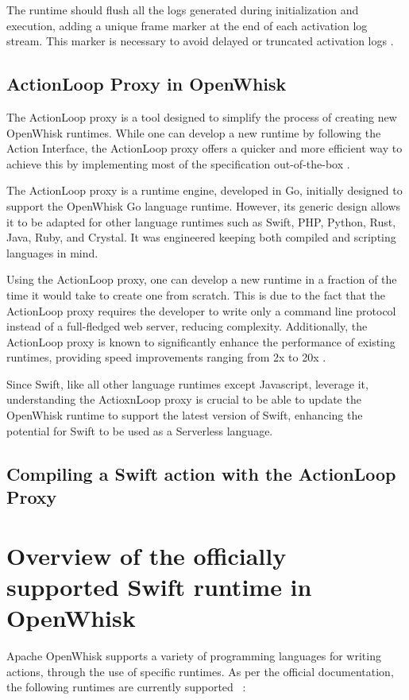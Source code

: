 The runtime should flush all the logs generated during initialization and execution, adding a unique frame marker at the end of each activation log stream. This marker is necessary to avoid delayed or truncated activation logs \cite{openwhisk2023}.

\subsection{ActionLoop Proxy in OpenWhisk}

The ActionLoop proxy is a tool designed to simplify the process of creating new OpenWhisk runtimes. While one can develop a new runtime by following the Action Interface, the ActionLoop proxy offers a quicker and more efficient way to achieve this by implementing most of the specification out-of-the-box \cite{action-proxy}.

The ActionLoop proxy is a runtime engine, developed in Go, initially designed to support the OpenWhisk Go language runtime. However, its generic design allows it to be adapted for other language runtimes such as Swift, PHP, Python, Rust, Java, Ruby, and Crystal. It was engineered keeping both compiled and scripting languages in mind.

Using the ActionLoop proxy, one can develop a new runtime in a fraction of the time it would take to create one from scratch. This is due to the fact that the ActionLoop proxy requires the developer to write only a command line protocol instead of a full-fledged web server, reducing complexity. Additionally, the ActionLoop proxy is known to significantly enhance the performance of existing runtimes, providing speed improvements ranging from 2x to 20x \cite{action-proxy}.

Since Swift, like all other language runtimes except Javascript, leverage it, understanding the ActioxnLoop proxy is crucial to be able to update the OpenWhisk runtime to support the latest version of Swift, enhancing the potential for Swift to be used as a Serverless language.

\subsection{Compiling a Swift action with the ActionLoop Proxy}

\section{Overview of the officially supported Swift runtime in OpenWhisk}
Apache OpenWhisk supports a variety of programming languages for writing actions, through the use of specific runtimes. As per the official documentation, the following runtimes are currently supported 
~\cite{openwhisk2023}:


